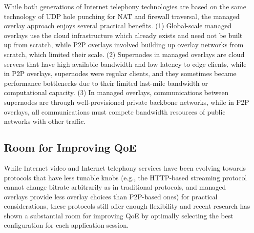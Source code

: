 While both generations of Internet telephony technologies are based on
the same technology of UDP hole punching for NAT and firewall traversal, 
the managed overlay approach enjoys several practical benefits.
(1) Global-scale managed overlays use the cloud infrastructure
which already exists and need not be built up from scratch, while 
P2P overlays involved building up overlay networks from
scratch, which limited their scale.
(2) Supernodes in managed overlays are cloud servers
that have high available bandwidth and low latency to edge clients, 
while in P2P overlays, supernodes were regular clients, 
and they sometimes became performance 
bottlenecks due to their limited last-mile bandwidth or computational capacity.
(3) In managed overlays, communications between supernodes are
through well-provisioned private backbone networks, while in P2P overlays, all 
communications must compete bandwidth resources of public networks with
other traffic.


\subsection{Room for Improving QoE}
\label{subsec:related:back:room}

While Internet video and Internet telephony services have been 
evolving towards protocols that have less tunable knobs
(e.g., the HTTP-based streaming protocol cannot 
change bitrate arbitrarily as in traditional protocols, and 
managed overlays provide less overlay choices than 
P2P-based ones)  for practical considerations, 
these protocols still offer enough flexibility and recent research has
shown a substantial room for improving QoE by optimally selecting 
the best configuration for each application session.

